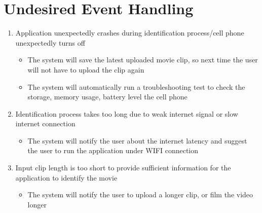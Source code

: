 \documentclass{article}
\begin{document}
\section{Undesired Event Handling}
\begin{enumerate}
    \item Application unexpectedly crashes during identification process/cell phone unexpectedly turns off
        \begin{itemize}
        \item The system will save the latest uploaded movie clip, so next time the user will not have to upload the clip again
        \item The system will automatically run a troubleshooting test to check the storage, memory usage, battery level the cell phone
        \end{itemize}
   \item Identification process takes too long due to weak internet signal or slow internet connection
        \begin{itemize}
        \item The system will notify the user about the internet latency and suggest the user to run the application under WIFI connection
        \end{itemize}
    \item Input clip length is too short to provide sufficient information for the application to identify the movie
        \begin{itemize}
        \item The system will notify the user to upload a longer clip, or film the video longer
        \end{itemize}
\end{enumerate}
\end{document}
